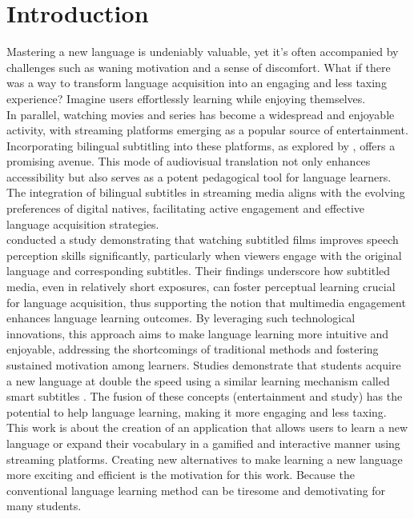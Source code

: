 \documentclass[12pt]{article}
\begin{document}
\section{Introduction}
Mastering a new language is undeniably valuable, yet it's often accompanied by challenges such as waning motivation and a sense of discomfort. What if there was a way to transform language acquisition into an engaging and less taxing experience? Imagine users effortlessly learning while enjoying themselves. \\
In parallel, watching movies and series has become a widespread and enjoyable activity, with streaming platforms emerging as a popular source of entertainment. Incorporating bilingual subtitling into these platforms, as explored by \cite{Gouleti-Katerina}, offers a promising avenue. This mode of audiovisual translation not only enhances accessibility but also serves as a potent pedagogical tool for language learners. The integration of bilingual subtitles in streaming media aligns with the evolving preferences of digital natives, facilitating active engagement and effective language acquisition strategies.\\
\cite{Birules-Muntane2016-on} conducted a study demonstrating that watching subtitled films improves speech perception skills significantly, particularly when viewers engage with the original language and corresponding subtitles. Their findings underscore how subtitled media, even in relatively short exposures, can foster perceptual learning crucial for language acquisition, thus supporting the notion that multimedia engagement enhances language learning outcomes.
By leveraging such technological innovations, this approach aims to make language learning more intuitive and enjoyable, addressing the shortcomings of traditional methods and fostering sustained motivation among learners.
Studies demonstrate that students acquire a new language at double the speed using a similar learning mechanism called smart subtitles \cite{Kovacs13}. The fusion of these concepts (entertainment and study) has the potential to help language learning, making it more engaging and less taxing. \\
This work is about the creation of an application that allows users to learn a new language or expand their vocabulary in a gamified and interactive manner using streaming platforms.
Creating new alternatives to make learning a new language more exciting and efficient is the motivation for this work. Because the conventional language learning method can be tiresome and demotivating for many students. \\
\end{document}
